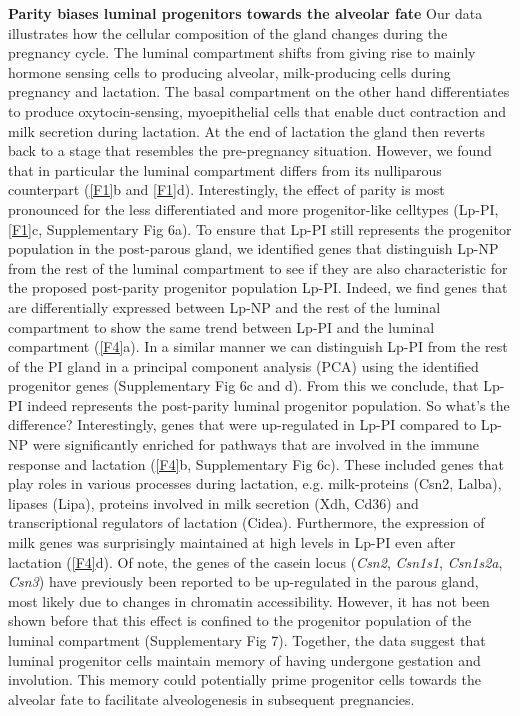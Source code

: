 \documentclass[titlepage, 12pt, oneside]{amsart}
\begin{document}
\textbf{Parity biases luminal progenitors towards the alveolar fate}
Our data illustrates how the cellular composition of the gland changes during the pregnancy cycle.
The luminal compartment shifts from giving rise to mainly hormone sensing cells to producing alveolar, milk-producing cells during pregnancy and lactation. 
The basal compartment on the other hand differentiates to produce oxytocin-sensing, myoepithelial cells that enable duct contraction and milk secretion during lactation.
At the end of lactation the gland then reverts back to a stage that resembles the pre-pregnancy situation.
However, we found that in particular the luminal compartment differs from its nulliparous counterpart (\autoref{F1}b and \autoref{F1}d).
Interestingly, the effect of parity is most pronounced for the less differentiated and more progenitor-like celltypes (Lp-PI, \autoref{F1}c, Supplementary Fig 6a).
To ensure that Lp-PI still represents the progenitor population in the post-parous gland, we identified genes that distinguish Lp-NP from the rest of the luminal compartment to see if they are also characteristic for the proposed post-parity progenitor population Lp-PI.
Indeed, we find genes that are differentially expressed between Lp-NP and the rest of the luminal compartment to show the same trend between Lp-PI and the luminal compartment (\autoref{F4}a).
In a similar manner we can distinguish Lp-PI from the rest of the PI gland in a principal component analysis (PCA) using the identified progenitor genes (Supplementary Fig 6c and d).
From this we conclude, that Lp-PI indeed represents the post-parity luminal progenitor population.
So what's the difference?
Interestingly, genes that were up-regulated in Lp-PI compared to Lp-NP were significantly enriched for pathways that are involved in the immune response and lactation (\autoref{F4}b, Supplementary Fig 6c).
These included genes that play roles in various processes during lactation, e.g. milk-proteins (Csn2, Lalba), lipases (Lipa), proteins involved in milk secretion (Xdh, Cd36) and transcriptional regulators of lactation (Cidea).
Furthermore, the expression of milk genes was surprisingly maintained at high levels in Lp-PI even after lactation (\autoref{F4}d).
Of note, the genes of the casein locus (\textit{Csn2}, \textit{Csn1s1}, \textit{Csn1s2a}, \textit{Csn3}) have previously been reported to be up-regulated in the parous gland, most likely due to changes in chromatin accessibility\autocite{Dos2015,Rijnkels2013}.
However, it has not been shown before that this effect is confined to the progenitor population of the luminal compartment (Supplementary Fig 7).
Together, the data suggest that luminal progenitor cells maintain memory of having undergone gestation and involution.
This memory could potentially prime progenitor cells towards the alveolar fate to facilitate alveologenesis in subsequent pregnancies.
\end{document}
